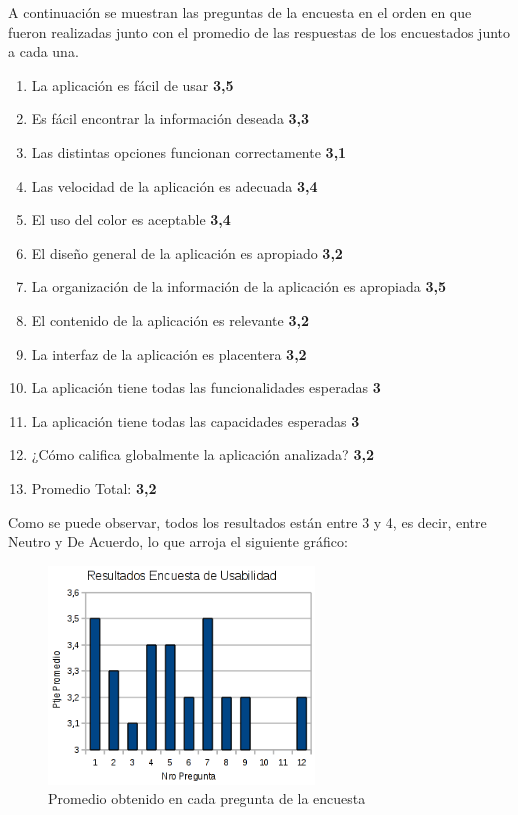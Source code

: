 \documentclass[10pt,letterpaper]{article}
\begin{document}
A continuación se muestran las preguntas de la encuesta en el orden en que fueron realizadas junto con el promedio de las respuestas de los encuestados junto a cada una.\\

\begin{enumerate}
\item La aplicación es fácil de usar \textbf{3,5}
\item Es fácil encontrar la información deseada \textbf{3,3}
\item Las distintas opciones funcionan correctamente \textbf{3,1}
\item Las velocidad de la aplicación es adecuada \textbf{3,4}
\item El uso del color es aceptable \textbf{3,4}
\item El diseño general de la aplicación es apropiado \textbf{3,2}
\item La organización de la información de la aplicación es apropiada \textbf{3,5}
\item El contenido de la aplicación es relevante \textbf{3,2}
\item La interfaz de la aplicación es placentera \textbf{3,2}
\item La aplicación tiene todas las funcionalidades esperadas \textbf{3}
\item La aplicación tiene todas las capacidades esperadas \textbf{3}
\item ¿Cómo califica globalmente la aplicación analizada? \textbf{3,2}

\item Promedio Total: \textbf{3,2}
\end{enumerate}

Como se puede observar, todos los resultados están entre 3 y 4, es decir, entre Neutro y De Acuerdo, lo que arroja el siguiente gráfico:\\

\begin{figure}[h]
\begin{center}
\includegraphics[width=200pt]{./imgs/encuesta.png}
\caption{Promedio obtenido en cada pregunta de la encuesta}
\end{center}
\end{figure}
\end{document}
